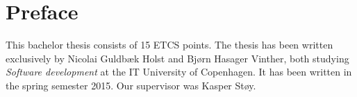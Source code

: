 \section*{Preface}
This bachelor thesis consists of 15 ETCS points.
The thesis has been written exclusively by Nicolai Guldbæk Holst and Bjørn Hasager Vinther, both studying \textit{Software development} at the IT University of Copenhagen.  It has been written in the spring semester 2015. Our supervisor was Kasper Støy. 